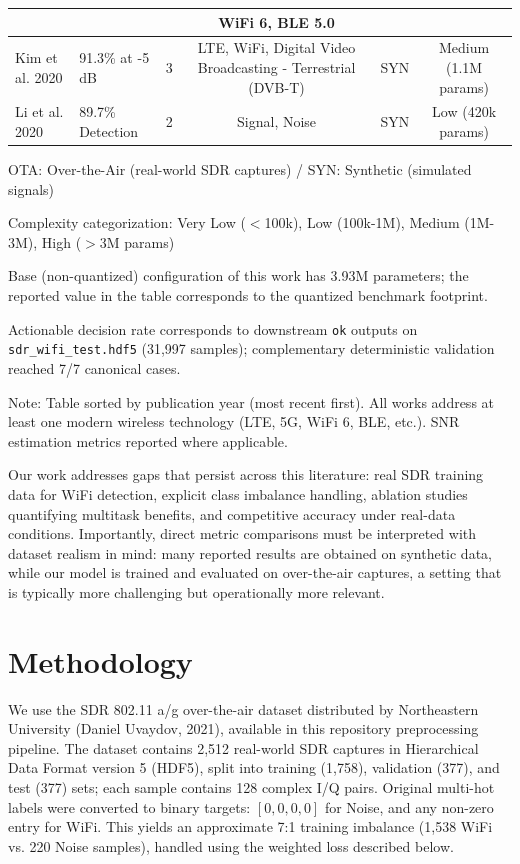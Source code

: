 \documentclass[conference]{IEEEtran}
\begin{document}
\begin{table}[!t]
{\begin{threeparttable}
\begin{tabular}{|l|l|c|c|c|c|}
 & & & WiFi 6, BLE 5.0 & & \\
\hline
Kim et al. 2020 \cite{kim2020deep} & 91.3\% at -5 dB & 3 & LTE, WiFi, Digital Video Broadcasting - Terrestrial (DVB-T) & SYN & Medium (1.1M params) \\
\hline
Li et al. 2020 \cite{li2020deep} & 89.7\% Detection & 2 & Signal, Noise & SYN & Low (420k params) \\
\hline
\end{tabular}
\begin{tablenotes}
\item[a] OTA: Over-the-Air (real-world SDR captures) / SYN: Synthetic (simulated signals)
\item[b] Complexity categorization: Very Low ($<$100k), Low (100k-1M), Medium (1M-3M), High ($>$3M params)
\item[c] Base (non-quantized) configuration of this work has 3.93M parameters; the reported value in the table corresponds to the quantized benchmark footprint.
\item[d] Actionable decision rate corresponds to downstream \texttt{ok} outputs on \texttt{sdr\_wifi\_test.hdf5} (31,997 samples); complementary deterministic validation reached 7/7 canonical cases.
\item Note: Table sorted by publication year (most recent first). All works address at least one modern wireless technology (LTE, 5G, WiFi 6, BLE, etc.). SNR estimation metrics reported where applicable.
\end{tablenotes}
\end{threeparttable}
}
\end{table}

Our work addresses gaps that persist across this literature: real SDR training data for WiFi detection, explicit class imbalance handling, ablation studies quantifying multitask benefits, and competitive accuracy under real-data conditions. Importantly, direct metric comparisons must be interpreted with dataset realism in mind: many reported results are obtained on synthetic data, while our model is trained and evaluated on over-the-air captures, a setting that is typically more challenging but operationally more relevant.

\section{Methodology}

We use the SDR 802.11 a/g over-the-air dataset distributed by Northeastern University (Daniel Uvaydov, 2021), available in this repository preprocessing pipeline. The dataset contains 2,512 real-world SDR captures in Hierarchical Data Format version 5 (HDF5), split into training (1,758), validation (377), and test (377) sets; each sample contains 128 complex I/Q pairs. Original multi-hot labels were converted to binary targets: $[0,0,0,0]$ for Noise, and any non-zero entry for WiFi. This yields an approximate 7:1 training imbalance (1,538 WiFi vs. 220 Noise samples), handled using the weighted loss described below.
\end{document}
